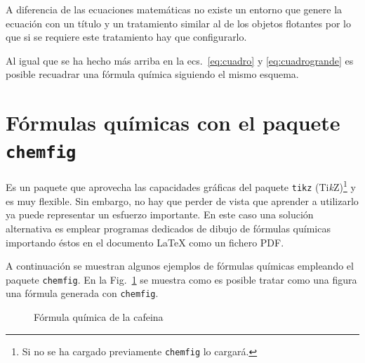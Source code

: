 \documentclass[ 		%
	11pt,				%
	a4paper,			%
	twoside,			%
	openright,			%
	final       		%
]{book}
\begin{document}
\begin{center}
\end{center}


A diferencia de las ecuaciones matemáticas no existe un entorno que genere la ecuación con un título y un tratamiento similar al de los objetos flotantes por lo que si se requiere este tratamiento hay que configurarlo.

Al igual que se ha hecho más arriba en la ecs.~\ref{eq:cuadro} y \ref{eq:cuadrogrande} es posible recuadrar una fórmula química siguiendo el mismo esquema.

\begin{center}
{\fboxsep 8pt \fboxrule 0.5pt
}
\end{center}




\section{Fórmulas químicas con el paquete \texttt{chemfig}}
Es un paquete que aprovecha las capacidades gráficas del paquete \texttt{tikz} (Ti\textit{k}Z)\footnote{Si no se ha cargado previamente \texttt{chemfig} lo cargará.} y es muy flexible. Sin embargo, no hay que perder de vista que aprender a utilizarlo ya puede representar un esfuerzo importante. En este caso una solución alternativa es emplear programas dedicados de dibujo de fórmulas químicas importando éstos en el documento \LaTeX{} como un fichero PDF.

A continuación se muestran algunos ejemplos de fórmulas químicas empleando el paquete \texttt{chemfig}. En la Fig.~\ref{fig:cafeina} se muestra como es posible tratar como una figura una fórmula generada con \texttt{chemfig}.


\begin{figure}[!h]
	\begin{center}
	\end{center}
	\caption{Fórmula química de la cafeina}\label{fig:cafeina}
\end{figure}
\end{document}
